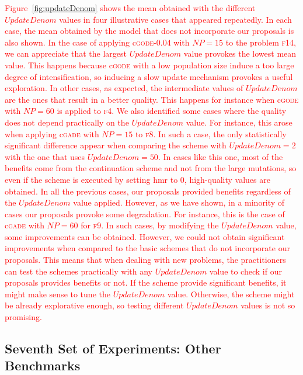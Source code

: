 \documentclass[review,3p]{elsarticle}
\newcommand{\HMR}{{\sc hmr}}
\begin{document}
\textcolor{red}{
Figure~\ref{fig:updateDenom} shows the mean obtained with the different $UpdateDenom$ values in four illustrative cases that appeared repeatedly.
%
In each case, the mean obtained by the model that does not incorporate our proposals is also shown.
%
In the case of applying c\textsc{gode-0.04} with $NP = 15$ to the problem \textsc{f14}, we can appreciate that the largest $UpdateDenom$ value provokes
the lowest mean value.
%
This happens because c\textsc{gode} with a low population size induce a too large degree of intensification, so inducing a slow update mechanism provokes a useful exploration.
%
In other cases, as expected, the intermediate values of $UpdateDenom$ are the ones that result in a better quality.
%
This happens for instance when c\textsc{gode} with $NP = 60$ is applied to \textsc{f4}.
%
We also identified some cases where the quality does not depend practically on the $UpdateDenom$ value.
%
For instance, this arose when applying c\textsc{gade} with $NP = 15$ to \textsc{f8}.
%
In such a case, the only statistically significant difference appear when comparing the scheme with $UpdateDenom = 2$ with the one that uses $UpdateDenom = 50$.
%
In cases like this one, most of the benefits come from the continuation scheme and not from the large mutations, so even if the scheme is executed by setting \HMR{} to 0,
high-quality values are obtained.
%
In all the previous cases, our proposals provided benefits regardless of the $UpdateDenom$ value applied.
%
However, as we have shown, in a minority of cases our proposals provoke some degradation.
%
For instance, this is the case of c\textsc{gade} with $NP = 60$ for \textsc{f9}.
%
In such cases, by modifying the $UpdateDenom$ value, some improvements can be obtained.
%
However, we could not obtain significant improvements when compared to the basic schemes that do not incorporate our proposals.
%
This means that when dealing with new problems, the practitioners can test the schemes practically with any $UpdateDenom$ value to check if our proposals
provides benefits or not.
%
If the scheme provide significant benefits, it might make sense to tune the $UpdateDenom$ value.
%
Otherwise, the scheme might be already explorative enough, so testing different $UpdateDenom$ values is not so promising.
}

\subsection{Seventh Set of Experiments: Other Benchmarks}
\end{document}
